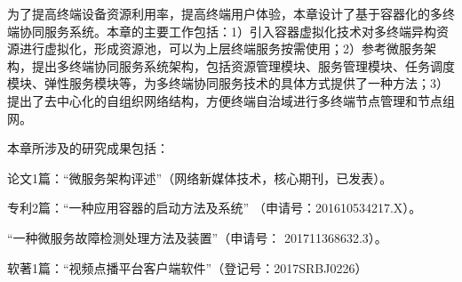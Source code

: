 为了提高终端设备资源利用率，提高终端用户体验，本章设计了基于容器化的多终端协同服务系统。本章的主要工作包括：1）引入容器虚拟化技术对多终端异构资源进行虚拟化，形成资源池，可以为上层终端服务按需使用；2）参考微服务架构，提出多终端协同服务系统架构，包括资源管理模块、服务管理模块、任务调度模块、弹性服务模块等，为多终端协同服务技术的具体方式提供了一种方法；3）提出了去中心化的自组织网络结构，方便终端自治域进行多终端节点管理和节点组网。

本章所涉及的研究成果包括：

论文1篇：“微服务架构评述”（网络新媒体技术，核心期刊，已发表）。

专利2篇：“一种应用容器的启动方法及系统” （申请号：201610534217.X）。

“一种微服务故障检测处理方法及装置”（申请号： 201711368632.3）。

软著1篇：“视频点播平台客户端软件”（登记号：2017SRBJ0226）